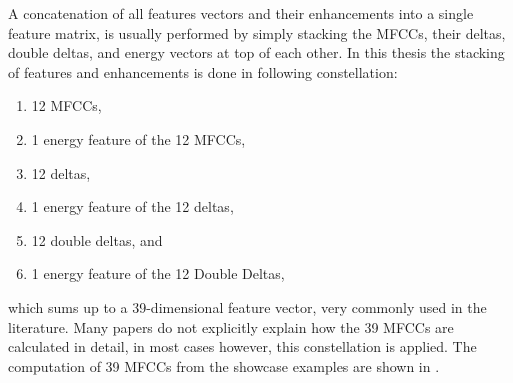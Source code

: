 A concatenation of all features vectors and their enhancements into a single feature matrix, is usually performed by simply stacking the MFCCs, their deltas, double deltas, and energy vectors at top of each other.
In this thesis the stacking of features and enhancements is done in following constellation:
\begin{enumerate}
    \item 12 MFCCs,
    \item 1 energy feature of the 12 MFCCs,
    \item 12 deltas,
    \item 1 energy feature of the 12 deltas,
    \item 12 double deltas, and
    \item 1 energy feature of the 12 Double Deltas,
\end{enumerate}
which sums up to a 39-dimensional feature vector, very commonly used in the literature.
Many papers do not explicitly explain how the 39 MFCCs are calculated in detail, in most cases however, this constellation is applied.
The computation of 39 MFCCs from the showcase examples are shown in .
